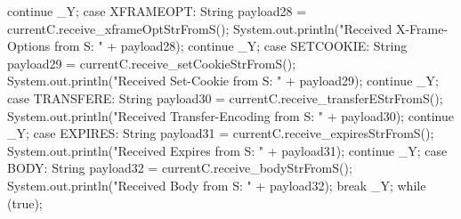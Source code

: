 \begin{code}
{{{{                    continue _Y;
                case XFRAMEOPT:
                    String payload28 = currentC.receive_xframeOptStrFromS();
                    System.out.println("Received X-Frame-Options from S: " + payload28);
                    continue _Y;
                case SETCOOKIE:
                    String payload29 = currentC.receive_setCookieStrFromS();
                    System.out.println("Received Set-Cookie from S: " + payload29);
                    continue _Y;
                case TRANSFERE:
                    String payload30 = currentC.receive_transferEStrFromS();
                    System.out.println("Received Transfer-Encoding from S: " + payload30);
                    continue _Y;
                case EXPIRES:
                    String payload31 = currentC.receive_expiresStrFromS();
                    System.out.println("Received Expires from S: " + payload31);
                    continue _Y;
                case BODY:
                    String payload32 = currentC.receive_bodyStrFromS();
                    System.out.println("Received Body from S: " + payload32);
                    break _Y;
            }
        } while (true);
    }
}\end{code}

